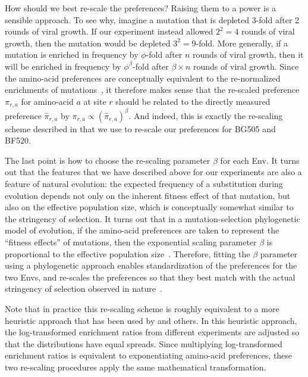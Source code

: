 \documentclass[9pt]{elife}
\begin{document}
How should we best re-scale the preferences?
Raising them to a power is a sensible approach.
To see why, imagine a mutation that is depleted 3-fold after 2 rounds of viral growth. 
If our experiment instead allowed $2^2 = 4$ rounds of viral growth, then the mutation would be depleted $3^2 = 9$-fold.
More generally, if a mutation is enriched in frequency by $\phi$-fold after $n$ rounds of viral growth, then it will be enriched in frequency by $\phi^{\beta}$-fold after $\beta \times n$ rounds of viral growth.
Since the amino-acid preferences are conceptually equivalent to the re-normalized enrichments of mutations~\cite[][\url{https://jbloomlab.github.io/dms_tools2/prefs.html}]{bloom2015software}, it therefore makes sense that the re-scaled preference $\pi_{r,a}$ for amino-acid $a$ at site $r$ should be related to the directly measured preference $\hat{\pi}_{r,a}$ by $\pi_{r,a} \propto \left(\hat{\pi}_{r,a}\right)^{\beta}$.
And indeed, this is exactly the re-scaling scheme described in \citet{hilton2017phydms} that we use to re-scale our preferences for BG505 and BF520.

The last point is how to choose the re-scaling parameter $\beta$ for each Env.
It turns out that the features that we have described above for our experiments are also a feature of natural evolution: the expected frequency of a substitution during evolution depends not only on the inherent fitness effect of that mutation, but also on the effective population size, which is conceptually somewhat similar to the stringency of selection.
It turns out that in a mutation-selection phylogenetic model of evolution, if the amino-acid preferences are taken to represent the ``fitness effects'' of mutations, then the exponential scaling parameter $\beta$ is proportional to the effective population size~\citep{halpern1998evolutionary,mccandlish2014modeling,bloom2014informed}.
Therefore, fitting the $\beta$ parameter using a phylogenetic approach enables standardization of the preferences for the two Envs, and re-scales the preferences so that they best match with the actual stringency of selection observed in nature~\citep{hilton2017phydms}.

Note that in practice this re-scaling scheme is roughly equivalent to a more heuristic approach that has been used by \citet{gray2017analysis} and others.
In this heuristic approach, the log-transformed enrichment ratios from different experiments are adjusted so that the distributions have equal spreads.
Since multiplying log-transformed enrichment ratios is equivalent to exponentiating amino-acid preferences, these two re-scaling procedures apply the same mathematical transformation.
\end{document}
